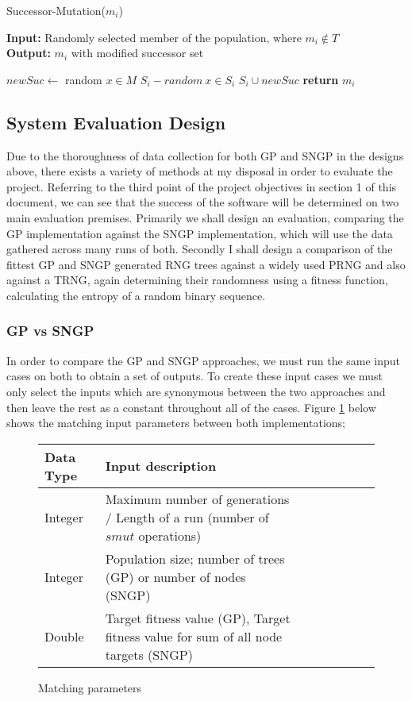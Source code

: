 \documentclass[a4paper,10.5pt]{article}
\begin{document}
\begin{algorithm}[H]
  \caption{Successor-Mutation($m_i$)}
  \textbf{Input:} Randomly selected member of the population, where $m_i \notin T$\\ 
  \textbf{Output:} $m_i$ with modified successor set\\

  \begin{algorithmic}[1]
   \Repeat
	\State $newSuc \gets$ random $x \in M$
   \State $S_i - random \ x \in S_i$
   \State $S_i \cup newSuc$
   \State \textbf{return} $m_i$
  \end{algorithmic}
\end{algorithm}

\newpage
\subsection{System Evaluation Design}
Due to the thoroughness of data collection for both GP and SNGP in the designs above, there exists a variety of methods at my disposal in order to evaluate the project. Referring to the third point of the project objectives in section 1 of this document, we can see that the success of the software will be determined on two main evaluation premises.
Primarily we shall design an evaluation, comparing the GP implementation against the SNGP implementation, which will use the data gathered across many runs of both.
Secondly I shall design a comparison of the fittest GP and SNGP generated RNG trees against a widely used PRNG and also against a TRNG, again determining their randomness using a fitness function, calculating the entropy of a random binary sequence.

\subsubsection{GP vs SNGP}
In order to compare the GP and SNGP approaches, we must run the same input cases on both to obtain a set of outputs. To create these input cases we must only select the inputs which are synonymous between the two approaches and then leave the rest as a constant throughout all of the cases. Figure \ref{inputforboth} below shows the matching input parameters between both implementations;

\begin{figure}[H]
\centering
\caption{Matching parameters}
\label{inputforboth}
\begin{tabular}{l*{6}{l}r}
Data Type             & Input description\\
\hline
Integer & Maximum number of generations / Length of a run (number of $smut$ operations)\\
Integer & Population size; number of trees (GP) or number of nodes (SNGP)\\
Double & Target fitness value (GP), Target fitness value for sum of all node targets (SNGP) \\
\end{tabular}
\end{figure}
\end{document}
